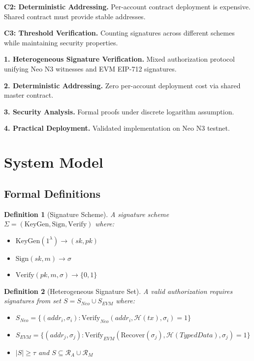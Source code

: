 \documentclass[10pt,twocolumn]{article}
\newtheorem{definition}{Definition}
\newcommand{\hash}[1]{\mathcal{H}(#1)}
\begin{document}
\textbf{C2: Deterministic Addressing.} Per-account contract deployment is expensive. Shared contract must provide stable addresses.

\textbf{C3: Threshold Verification.} Counting signatures across different schemes while maintaining security properties.

\textbf{1. Heterogeneous Signature Verification.} Mixed authorization protocol unifying Neo N3 witnesses and EVM EIP-712 signatures.

\textbf{2. Deterministic Addressing.} Zero per-account deployment cost via shared master contract.

\textbf{3. Security Analysis.} Formal proofs under discrete logarithm assumption.

\textbf{4. Practical Deployment.} Validated implementation on Neo N3 testnet.

\section{System Model}

\subsection{Formal Definitions}

\begin{definition}[Signature Scheme]
A signature scheme $\Sigma = (\text{KeyGen}, \text{Sign}, \text{Verify})$ where:
\begin{itemize}[leftmargin=*,topsep=2pt,itemsep=1pt]
\item $\text{KeyGen}(1^\lambda) \rightarrow (sk, pk)$
\item $\text{Sign}(sk, m) \rightarrow \sigma$
\item $\text{Verify}(pk, m, \sigma) \rightarrow \{0,1\}$
\end{itemize}
\end{definition}

\begin{definition}[Heterogeneous Signature Set]
A valid authorization requires signatures from set $S = S_{Neo} \cup S_{EVM}$ where:
\begin{itemize}[leftmargin=*,topsep=2pt,itemsep=1pt]
\item $S_{Neo} = \{(addr_i, \sigma_i) : \text{Verify}_{Neo}(addr_i, \hash{tx}, \sigma_i) = 1\}$
\item $S_{EVM} = \{(addr_j, \sigma_j) : \text{Verify}_{EVM}(\text{Recover}(\sigma_j), \hash{TypedData}, \sigma_j) = 1\}$
\item $|S| \geq \tau$ and $S \subseteq \mathcal{R}_A \cup \mathcal{R}_M$
\end{itemize}
\end{definition}
\end{document}
